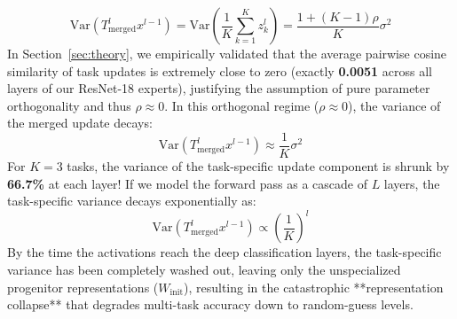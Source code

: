 \documentclass{article}
\begin{document}
\begin{equation}
    \text{Var}\left( T_{\text{merged}}^l x^{l-1} \right) = \text{Var}\left( \frac{1}{K} \sum_{k=1}^K z_k^l \right) = \frac{1 + (K - 1)\rho}{K} \sigma^2
\end{equation}
In Section~\ref{sec:theory}, we empirically validated that the average pairwise cosine similarity of task updates is extremely close to zero (exactly \textbf{0.0051} across all layers of our ResNet-18 experts), justifying the assumption of pure parameter orthogonality and thus $\rho \approx 0$.
In this orthogonal regime ($\rho \approx 0$), the variance of the merged update decays:
\begin{equation}
    \text{Var}\left( T_{\text{merged}}^l x^{l-1} \right) \approx \frac{1}{K} \sigma^2
\end{equation}
For $K=3$ tasks, the variance of the task-specific update component is shrunk by \textbf{66.7\%} at each layer! If we model the forward pass as a cascade of $L$ layers, the task-specific variance decays exponentially as:
\begin{equation}
    \text{Var}(T_{\text{merged}}^l x^{l-1}) \propto \left( \frac{1}{K} \right)^l
\end{equation}
By the time the activations reach the deep classification layers, the task-specific variance has been completely washed out, leaving only the unspecialized progenitor representations ($W_{\text{init}}$), resulting in the catastrophic **representation collapse** that degrades multi-task accuracy down to random-guess levels.
\end{document}

